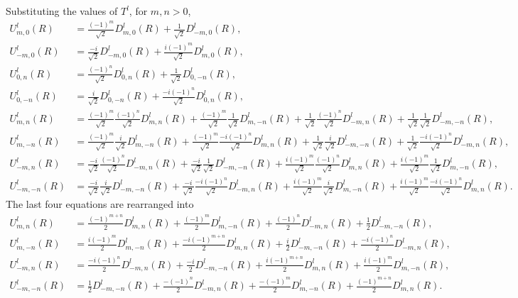 \documentclass[onecolumn,11pt]{IEEEtran}
\begin{document}
Substituting the values of $T^l$, for $m,n>0$,
\begin{align*}
    U^l_{m,0} (R) &= \frac{(-1)^m}{\sqrt{2}} D^l_{m,0} (R) + \frac{1}{\sqrt{2}} D^l_{-m,0} (R),\\
    U^l_{-m,0} (R) &= \frac{-i}{\sqrt{2}} D^l_{-m,0} (R) + \frac{i(-1)^m}{\sqrt{2}} D^l_{m,0} (R),\\
    U^l_{0,n} (R) &= \frac{(-1)^n}{\sqrt{2}} D^l_{0,n}(R) + \frac{1}{\sqrt{2}} D^l_{0,-n}(R),\\
    U^l_{0,-n} (R) &= \frac{i}{\sqrt{2}} D^l_{0,-n}(R) + \frac{-i(-1)^n}{\sqrt{2}} D^l_{0,n}(R),\\
    U^l_{m,n} (R) &= \frac{(-1)^m}{\sqrt{2}} \frac{(-1)^n}{\sqrt{2}} D^l_{m,n} (R) + \frac{(-1)^m}{\sqrt{2}} \frac{1}{\sqrt{2}} D^l_{m,-n} (R) + \frac{1}{\sqrt{2}} \frac{(-1)^n}{\sqrt{2}} D^l_{-m,n} (R) + \frac{1}{\sqrt{2}} \frac{1}{\sqrt{2}} D^l_{-m,-n} (R),\\
    U^l_{m,-n} (R) &= \frac{(-1)^m}{\sqrt{2}} \frac{i}{\sqrt{2}} D^l_{m,-n} (R) + \frac{(-1)^m}{\sqrt{2}} \frac{-i(-1)^n}{\sqrt{2}} D^l_{m,n} (R) + \frac{1}{\sqrt{2}} \frac{i}{\sqrt{2}} D^l_{-m,-n} (R) + \frac{1}{\sqrt{2}} \frac{-i(-1)^n}{\sqrt{2}} D^l_{-m,n} (R),\\
    U^l_{-m,n} (R) &= \frac{-i}{\sqrt{2}} \frac{(-1)^n}{\sqrt{2}} D^l_{-m,n} (R) + \frac{-i}{\sqrt{2}} \frac{1}{\sqrt{2}} D^l_{-m,-n} (R) + \frac{i(-1)^m}{\sqrt{2}} \frac{(-1)^n}{\sqrt{2}} D^l_{m,n} (R) + \frac{i(-1)^m}{\sqrt{2}} \frac{1}{\sqrt{2}} D^l_{m,-n} (R),\\
    U^l_{-m,-n} (R) &= \frac{-i}{\sqrt{2}} \frac{i}{\sqrt{2}} D^l_{-m,-n} (R) + \frac{-i}{\sqrt{2}} \frac{-i(-1)^n}{\sqrt{2}} D^l_{-m,n} (R) + \frac{i(-1)^m}{\sqrt{2}} \frac{i}{\sqrt{2}} D^l_{m,-n} (R) + \frac{i(-1)^m}{\sqrt{2}} \frac{-i(-1)^n}{\sqrt{2}} D^l_{m,n} (R).
\end{align*}
The last four equations are rearranged into
\begin{align*}
    U^l_{m,n} (R) &= \frac{(-1)^{m+n}}{2}  D^l_{m,n} (R) + \frac{(-1)^m}{2}  D^l_{m,-n} (R) +  \frac{(-1)^n}{2} D^l_{-m,n} (R) + \frac{1}{2}  D^l_{-m,-n} (R),\\
    U^l_{m,-n} (R) &= \frac{i(-1)^m}{2}  D^l_{m,-n} (R) + \frac{-i(-1)^{m+n}}{2} D^l_{m,n} (R) +  \frac{i}{2} D^l_{-m,-n} (R) +  \frac{-i(-1)^n}{2} D^l_{-m,n} (R),\\
    U^l_{-m,n} (R) &=  \frac{-i(-1)^n}{2} D^l_{-m,n} (R) + \frac{-i}{2}  D^l_{-m,-n} (R) + \frac{i(-1)^{m+n}}{2}  D^l_{m,n} (R) + \frac{i(-1)^m}{2}  D^l_{m,-n} (R),\\
    U^l_{-m,-n} (R) &= \frac{1}{2}  D^l_{-m,-n} (R) +  \frac{-(-1)^n}{2} D^l_{-m,n} (R) + \frac{-(-1)^m}{2}  D^l_{m,-n} (R) + \frac{(-1)^{m+n}}{2}  D^l_{m,n} (R).
\end{align*}
\end{document}
